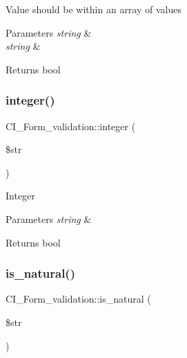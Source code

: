 Value should be within an array of values


\begin{DoxyParams}{Parameters}
{\em string} & \\
\hline
{\em string} & \\
\hline
\end{DoxyParams}
\begin{DoxyReturn}{Returns}
bool 
\end{DoxyReturn}
\mbox{\label{class_c_i___form__validation_a68bed0389598c75c06aff04c80624f7a}} 
\subsubsection{\texorpdfstring{integer()}{integer()}}
{\footnotesize\ttfamily C\+I\+\_\+\+Form\+\_\+validation\+::integer (\begin{DoxyParamCaption}\item[{}]{\$str }\end{DoxyParamCaption})}

Integer


\begin{DoxyParams}{Parameters}
{\em string} & \\
\hline
\end{DoxyParams}
\begin{DoxyReturn}{Returns}
bool 
\end{DoxyReturn}
\mbox{\label{class_c_i___form__validation_a75d34c2da83d6425bb0feb129f69400a}} 
\subsubsection{\texorpdfstring{is\+\_\+natural()}{is\_natural()}}
{\footnotesize\ttfamily C\+I\+\_\+\+Form\+\_\+validation\+::is\+\_\+natural (\begin{DoxyParamCaption}\item[{}]{\$str }\end{DoxyParamCaption})}

